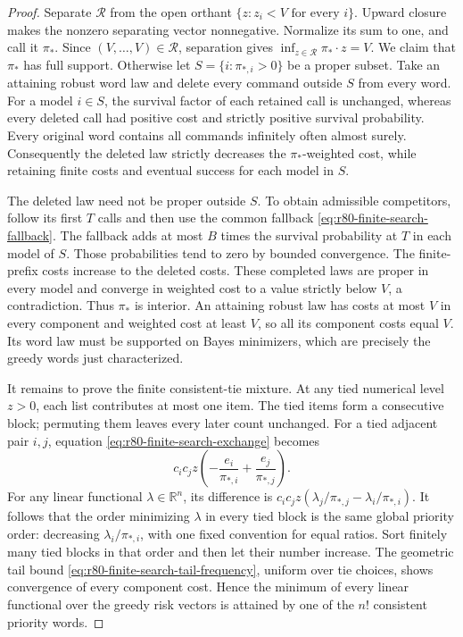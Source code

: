 \begin{proof}
Separate $\mathcal R$ from the open orthant
$\{z:z_i<V\text{ for every }i\}$.  Upward closure makes the
nonzero separating vector nonnegative.  Normalize its sum to one,
and call it $\pi_*$.  Since $(V,\ldots,V)\in\mathcal R$, separation
gives $\inf_{z\in\mathcal R}\pi_*\cdot z=V$.
We claim that $\pi_*$ has full support.  Otherwise let
$S=\{i:\pi_{*,i}>0\}$ be a proper subset.  Take an attaining robust
word law and delete every command outside $S$ from every word.
For a model $i\in S$, the survival factor of each retained call is
unchanged, whereas every deleted call had positive cost and strictly
positive survival probability.  Every original word contains all
commands infinitely often almost surely.  Consequently the deleted
law strictly decreases the $\pi_*$-weighted cost, while retaining
finite costs and eventual success for each model in $S$.

The deleted law need not be proper outside $S$.  To obtain admissible
competitors, follow its first $T$ calls and then use the common
fallback \eqref{eq:r80-finite-search-fallback}.  The fallback adds
at most $B$ times the survival probability at $T$ in each model of
$S$.  Those probabilities tend to zero by bounded convergence.
The finite-prefix costs increase to the deleted costs.  These
completed laws are proper in every model and converge in weighted
cost to a value strictly below $V$, a contradiction.  Thus $\pi_*$
is interior.  An attaining robust law has costs at most $V$ in
every component and weighted cost at least $V$, so all its component
costs equal $V$.  Its word law must be supported on Bayes minimizers,
which are precisely the greedy words just characterized.

It remains to prove the finite consistent-tie mixture.  At any tied
numerical level $z>0$, each list contributes at most one item.  The
tied items form a consecutive block; permuting them leaves every
later count unchanged.  For a tied adjacent pair $i,j$, equation
\eqref{eq:r80-finite-search-exchange} becomes
\begin{equation}\label{eq:r80-finite-search-tied-vector}
 c_ic_j z\left(-\frac{e_i}{\pi_{*,i}}
                    +\frac{e_j}{\pi_{*,j}}\right).
\end{equation}
For any linear functional $\lambda\in\mathbb R^n$, its difference
is $c_ic_jz(\lambda_j/\pi_{*,j}-\lambda_i/\pi_{*,i})$.
It follows that the order minimizing $\lambda$ in every tied block
is the same global priority order: decreasing
$\lambda_i/\pi_{*,i}$, with one fixed convention for equal ratios.
Sort finitely many tied blocks in that order and then let their
number increase.  The geometric tail bound
\eqref{eq:r80-finite-search-tail-frequency}, uniform over tie
choices, shows convergence of every component cost.  Hence the
minimum of every linear functional over the greedy risk vectors
is attained by one of the $n!$ consistent priority words.


\end{proof}
